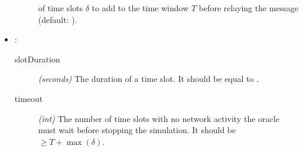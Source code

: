 \begin{itemize}
\begin{description}
				of time slots \(\delta\) to add to the time
				window \(T\) before relaying the message
				(default: ).
		\end{description}
	\item {}:
		\begin{description}
			\item[slotDuration] \textit{(seconds)} The duration of a
				time slot. It should be equal to
				.
			\item[timeout] \textit{(int)} The number of time slots
				with no network activity the oracle must wait
				before stopping the simulation. It should be
				\(\geq T+\max(\delta)\).
		\end{description}
\end{itemize}
